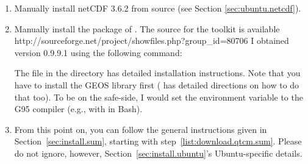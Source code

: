 \begin{enumerate}
\item Manually install netCDF 3.6.2 from source
	(see Section \ref{sec:ubuntu.netcdf}).

\item Manually install the  package of
	.  
	The source for the  toolkit is
	available 
		{%
			{http://sourceforge.net/project/showfiles.php?group_id=80706}}
	I obtained version 0.9.9.1 using the
	following  command:
	\begin{codeblock}
	\end{codeblock}

	The  file in the  directory has
	detailed installation instructions.  Note that you have to
	install the GEOS library first ( has detailed
	directions on how to do that too).  To be on the safe-side,
	I would set the  environment variable to the G95
	compiler
	(e.g., with  in Bash).

\item From this point on, you can follow the
	general instructions given in Section~\ref{sec:install.sum},
	starting with step~\ref{list:download.qtcm.sum}.
	Please do not ignore, however, Section~\ref{sec:install.ubuntu}'s
	Ubuntu-specific details.

\end{enumerate}




